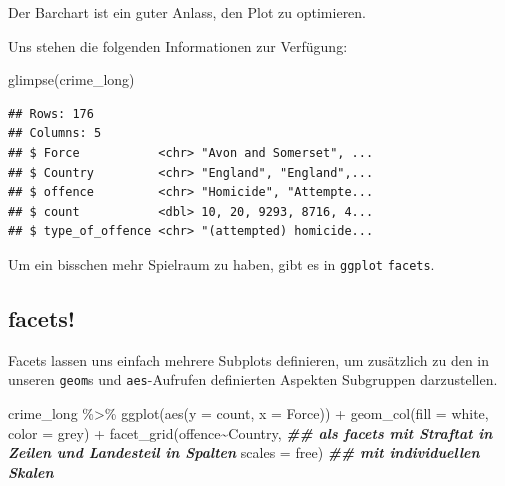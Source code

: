 \documentclass[
]{book}
\newenvironment{Shaded}{\begin{snugshade}}{\end{snugshade}}
\newcommand{\AttributeTok}[1]{\textcolor[rgb]{0.77,0.63,0.00}{#1}}
\newcommand{\DocumentationTok}[1]{\textcolor[rgb]{0.56,0.35,0.01}{\textbf{\textit{#1}}}}
\newcommand{\FunctionTok}[1]{\textcolor[rgb]{0.00,0.00,0.00}{#1}}
\newcommand{\NormalTok}[1]{#1}
\newcommand{\SpecialCharTok}[1]{\textcolor[rgb]{0.00,0.00,0.00}{#1}}
\newcommand{\StringTok}[1]{\textcolor[rgb]{0.31,0.60,0.02}{#1}}
\begin{document}
Der Barchart ist ein guter Anlass, den Plot zu optimieren.

Uns stehen die folgenden Informationen zur Verfügung:

\begin{Shaded}
\begin{Highlighting}[]
\FunctionTok{glimpse}\NormalTok{(crime\_long)}
\end{Highlighting}
\end{Shaded}

\begin{verbatim}
## Rows: 176
## Columns: 5
## $ Force           <chr> "Avon and Somerset", ...
## $ Country         <chr> "England", "England",...
## $ offence         <chr> "Homicide", "Attempte...
## $ count           <dbl> 10, 20, 9293, 8716, 4...
## $ type_of_offence <chr> "(attempted) homicide...
\end{verbatim}

Um ein bisschen mehr Spielraum zu haben, gibt es in \texttt{ggplot} \texttt{facets}.

\hypertarget{facets}{%
\subsection{facets!}\label{facets}}

Facets lassen uns einfach mehrere Subplots definieren, um zusätzlich zu den in unseren \texttt{geom}s und \texttt{aes}-Aufrufen definierten Aspekten Subgruppen darzustellen.

\begin{Shaded}
\begin{Highlighting}[]
\NormalTok{crime\_long }\SpecialCharTok{\%\textgreater{}\%}  
  \FunctionTok{ggplot}\NormalTok{(}\FunctionTok{aes}\NormalTok{(}\AttributeTok{y =}\NormalTok{ count,}
             \AttributeTok{x =}\NormalTok{ Force)) }\SpecialCharTok{+}
  \FunctionTok{geom\_col}\NormalTok{(}\AttributeTok{fill =} \StringTok{\textquotesingle{}white\textquotesingle{}}\NormalTok{,}
           \AttributeTok{color =} \StringTok{\textquotesingle{}grey\textquotesingle{}}\NormalTok{) }\SpecialCharTok{+}
  \FunctionTok{facet\_grid}\NormalTok{(offence}\SpecialCharTok{\textasciitilde{}}\NormalTok{Country, }\DocumentationTok{\#\# als facets mit Straftat in Zeilen und Landesteil in Spalten}
             \AttributeTok{scales =} \StringTok{\textquotesingle{}free\textquotesingle{}}\NormalTok{) }\DocumentationTok{\#\# mit individuellen Skalen}
\end{Highlighting}
\end{Shaded}
\end{document}
